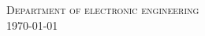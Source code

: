 \begin{center}
\vspace{5cm}



\vfill
\textsc{\large Department of electronic engineering}\\[0.5cm]

{\large \today}\\[3cm] %
\end{center}
 